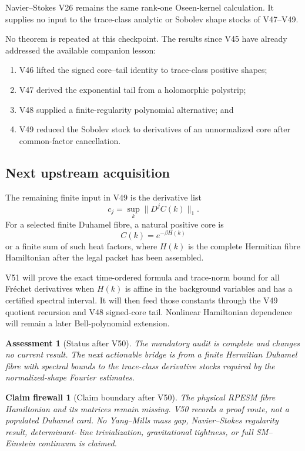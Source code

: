 \documentclass[11pt]{article}
\newtheorem{firewall}[theorem]{Claim firewall}
\newtheorem{assessment}[theorem]{Assessment}
\theoremstyle{remark}
\begin{document}
Navier--Stokes V26 remains the same rank-one Oseen-kernel calculation.
It supplies no input to the trace-class analytic or Sobolev shape
stocks of V47--V49.

No theorem is repeated at this checkpoint.  The results since V45
have already addressed the available companion lesson:
\begin{enumerate}
\item V46 lifted the signed core--tail identity to trace-class
positive shapes;
\item V47 derived the exponential tail from a holomorphic polystrip;
\item V48 supplied a finite-regularity polynomial alternative; and
\item V49 reduced the Sobolev stock to derivatives of an
unnormalized core after common-factor cancellation.
\end{enumerate}

\subsection{Next upstream acquisition}

The remaining finite input in V49 is the derivative list
\[
 c_j=
 \sup_k\|D^jC(k)\|_1.
\]
For a selected finite Duhamel fibre, a natural positive core is
\[
                         C(k)=e^{-\beta H(k)}
\]
or a finite sum of such heat factors, where \(H(k)\) is the complete
Hermitian fibre Hamiltonian after the legal packet has been
assembled.

V51 will prove the exact time-ordered formula and trace-norm bound
for all Fr\'echet derivatives when \(H(k)\) is affine in the
background variables and has a certified spectral interval.  It
will then feed those constants through the V49 quotient recursion
and V48 signed-core tail.  Nonlinear Hamiltonian dependence will
remain a later Bell-polynomial extension.

\begin{assessment}[Status after V50]
\label{ass:v12v50-status}
The mandatory audit is complete and changes no current result.  The
next actionable bridge is from a finite Hermitian Duhamel fibre with
spectral bounds to the trace-class derivative stocks required by the
normalized-shape Fourier estimates.
\end{assessment}

\begin{firewall}[Claim boundary after V50]
\label{fire:v12v50-claim}
The physical RPESM fibre Hamiltonian and its matrices remain missing.
V50 records a proof route, not a populated Duhamel card.  No
Yang--Mills mass gap, Navier--Stokes regularity result, determinant-
line trivialization, gravitational tightness, or full SM--Einstein
continuum is claimed.
\end{firewall}
\end{document}
